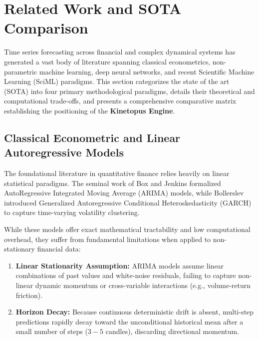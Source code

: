 \documentclass[11pt,a4paper]{article}
\begin{document}
\section{Related Work and SOTA Comparison}
\label{sec:related_work}

Time series forecasting across financial and complex dynamical systems has generated a vast body of literature spanning classical econometrics, non-parametric machine learning, deep neural networks, and recent Scientific Machine Learning (SciML) paradigms. This section categorizes the state of the art (SOTA) into four primary methodological paradigms, details their theoretical and computational trade-offs, and presents a comprehensive comparative matrix establishing the positioning of the \textbf{Kinetopus Engine}.

\subsection{Classical Econometric and Linear Autoregressive Models}

The foundational literature in quantitative finance relies heavily on linear statistical paradigms. The seminal work of Box and Jenkins \cite{box1970time} formalized AutoRegressive Integrated Moving Average (ARIMA) models, while Bollerslev \cite{bollerslev1986generalized} introduced Generalized Autoregressive Conditional Heteroskedasticity (GARCH) to capture time-varying volatility clustering.

While these models offer exact mathematical tractability and low computational overhead, they suffer from fundamental limitations when applied to non-stationary financial data:
\begin{enumerate}[leftmargin=1.5em]
    \item \textbf{Linear Stationarity Assumption:} ARIMA models assume linear combinations of past values and white-noise residuals, failing to capture non-linear dynamic momentum or cross-variable interactions (e.g., volume-return friction).
    \item \textbf{Horizon Decay:} Because continuous deterministic drift is absent, multi-step predictions rapidly decay toward the unconditional historical mean after a small number of steps ($3-5$ candles), discarding directional momentum.
\end{enumerate}
\end{document}
